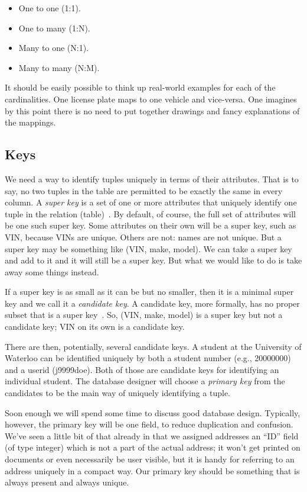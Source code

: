 \documentclass[a4paper]{report}
\begin{document}
\begin{itemize}
\item One to one (1:1).
\item One to many (1:N).
\item Many to one (N:1).
\item Many to many (N:M).
\end{itemize}

It should be easily possible to think up real-world examples for each of the cardinalities. One license plate maps to one vehicle and vice-versa. One imagines by this point there is no need to put together drawings and fancy explanations of the mappings.

\subsection*{Keys}

We need a way to identify tuples uniquely in terms of their attributes. That is to say, no two tuples in the table are permitted to be exactly the same in every column. A \textit{super key} is a set of one or more attributes that uniquely identify one tuple in the relation (table)~\cite{dsc}. By default, of course, the full set of attributes will be one such super key. Some attributes on their own will be a super key, such as VIN, because VINs are unique. Others are not: names are not unique. But a super key may be something like (VIN, make, model). We can take a super key and add to it and it will still be a super key. But what we would like to do is take away some things instead.

If a super key is as small as it can be but no smaller, then it is a minimal super key and we call it a \textit{candidate key}. A candidate key, more formally, has no proper subset that is a super key~\cite{dsc}. So, (VIN, make, model) is a super key but not a candidate key; VIN on its own is a candidate key.

There are then, potentially, several candidate keys. A student at the University of Waterloo can be identified uniquely by both a student number (e.g., 20000000) and a userid (j9999doe). Both of those are candidate keys for identifying an individual student. The database designer will choose a \textit{primary key} from the candidates to be the main way of uniquely identifying a tuple. 

Soon enough we will spend some time to discuss good database design. Typically, however, the primary key will be one field, to reduce duplication and confusion. We've seen a little bit of that already in that we assigned addresses an ``ID'' field (of type integer) which is not a part of the actual address; it won't get printed on documents or even necessarily be user visible, but it is handy for referring to an address uniquely in a compact way. Our primary key should be something that is always present and always unique.
\end{document}
